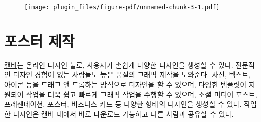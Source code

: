 \documentclass[
  letterpaper,
]{book}
\begin{document}
\begin{figure}[H]

{\centering \texttt{[image: plugin\_files/figure-pdf/unnamed-chunk-3-1.pdf]}

}

\end{figure}

\hypertarget{uxd3ecuxc2a4uxd130-uxc81cuxc791}{%
\section{포스터 제작}\label{uxd3ecuxc2a4uxd130-uxc81cuxc791}}

{}

\href{https://canva.com/}{캔바}는 온라인 디자인 툴로, 사용자가 손쉽게
다양한 디자인을 생성할 수 있다. 전문적인 디자인 경험이 없는 사람들도
높은 품질의 그래픽 제작을 도와준다. 사진, 텍스트, 아이콘 등을 드래그 앤
드롭하는 방식으로 디자인을 할 수 있으며, 다양한 템플릿이 지원되어 작업을
더욱 쉽고 빠르게 그래픽 작업을 수행할 수 있으며, 소셜 미디어 포스트,
프레젠테이션, 포스터, 비즈니스 카드 등 다양한 형태의 디자인을 생성할 수
있다. 작업한 디자인은 캔바 내에서 바로 다운로드 가능하고 다른 사람과
공유할 수 있다.
\end{document}
